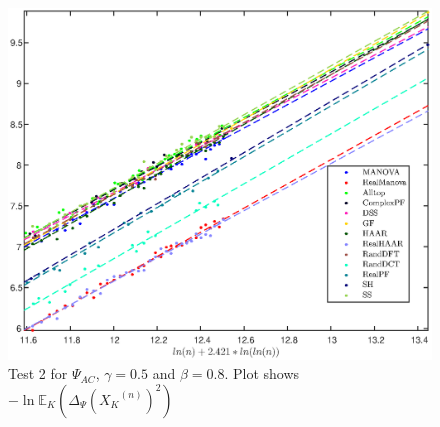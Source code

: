 \documentclass[a4paper,12pt]{article}
\newcommand{\TODO}[1]{ {\tt \color{red} [TODO:#1] } }
\newcommand{\E}{\ensuremath{\mathbb{E}}}
\newcommand{\specstat}{\ensuremath{\Psi}}
\newcommand{\Xk}{\ensuremath{X_K}}
\begin{document}
%


\begin{figure}[h]
\centering
\includegraphics[width=5in]{FuncACAll_Mse_gamma0_5_beta1_25_minN1000_pnas2.eps}
\caption{Test 2 for $\specstat_{AC}$, $\gamma=0.5$ and $\beta=0.8$. Plot shows $-\ln\E_{K}(\Delta_\specstat(\Xk^{(n)})^2)$
}
\label{fig:f_AC}
\end{figure}
\end{document}
